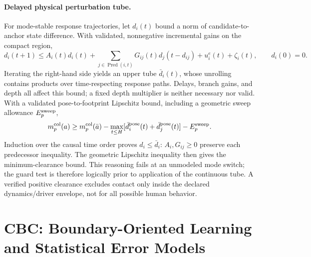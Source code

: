 \documentclass[10pt]{article}
\begin{document}
\paragraph{Delayed physical perturbation tube.}
For mode-stable response trajectories, let $d_i(t)$ bound a norm of candidate-to-anchor state difference. With validated, nonnegative incremental gains on the compact region,
\begin{equation}
 d_i(t+1)\le A_i(t)d_i(t)+\sum_{j\in\operatorname{Pred}(i,t)}G_{ij}(t)d_j(t-d_{ij})
 +u_i^e(t)+\zeta_i(t),\qquad d_i(0)=0.
 \label{eq:tuberec}
\end{equation}
Iterating the right-hand side yields an upper tube $\bar d_i(t)$, whose unrolling contains products over time-respecting response paths. Delays, branch gains, and depth all affect this bound; a fixed depth multiplier is neither necessary nor valid. With a validated pose-to-footprint Lipschitz bound, including a geometric sweep allowance $E_p^{\rm sweep}$,
\begin{equation}
 m_p^{\rm col}(a)\ge m_p^{\rm col}(\bar a)-
 \max_{t\le H}[\bar d_i^{\rm pose}(t)+\bar d_j^{\rm pose}(t)]-E_p^{\rm sweep}.
 \label{eq:clearancetube}
\end{equation}
Induction over the causal time order proves $d_i\le\bar d_i$: $A_i,G_{ij}\ge0$ preserve each predecessor inequality. The geometric Lipschitz inequality then gives the minimum-clearance bound. This reasoning fails at an unmodeled mode switch; the guard test is therefore logically prior to application of the continuous tube. A verified positive clearance excludes contact only inside the declared dynamics/driver envelope, not for all possible human behavior.

\section{CBC: Boundary-Oriented Learning and Statistical Error Models}
\label{app:cbctrain}
\end{document}
